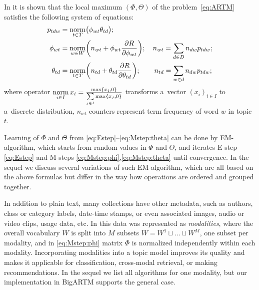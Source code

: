 \documentclass[russian,english]{llncs}
\newcommand{\norm}{\mathop{\rm norm}\limits}
\begin{document}
In \cite{voron14dan-eng} it is shown that the \mbox{local} maximum $(\Phi,\Theta)$
of the problem~\eqref{eq:ARTM} satisfies
the following system of equations:
\begin{align}
    \label{eq:Estep}
    p_{tdw} &= \norm_{t\in T} \bigl(\phi_{wt}\theta_{td}\bigr);
\\
    \label{eq:Mstep:phi}
    \phi_{wt} &= \norm_{w\in W}
        \biggl(
            n_{wt} + \phi_{wt} \frac{\partial R}{\partial \phi_{wt}}
        \biggr);
        \quad
            n_{wt} = \sum_{d\in D} n_{dw} p_{tdw};
\\
    \label{eq:Mstep:theta}
    \theta_{td} &= \norm_{t\in T}
        \biggl(
            n_{td} + \theta_{td} \frac{\partial R}{\partial \theta_{td}}
        \biggr);
        \quad\quad
            n_{td} = \sum_{w\in d} n_{dw} p_{tdw};
\end{align}
where operator
$\norm_{i \in I} x_i = \frac{\max\{x_i,0\}}{\sum\limits_{j\in I} \max\{x_j,0\}}$
transforms a~vector $(x_i)_{i \in I}$ to a~discrete distribution,
$n_{wt}$ counters represent term frequency of word $w$ in topic $t$.

Learning of $\Phi$ and $\Theta$ from \eqref{eq:Estep}--\eqref{eq:Mstep:theta} can be done by EM-algorithm,
which starts from random values in $\Phi$ and $\Theta$, and iterates
E-step \eqref{eq:Estep} and
M-steps \eqref{eq:Mstep:phi},\eqref{eq:Mstep:theta}
until convergence.
In the sequel we discuss several variations of such EM-algorithm,
which are all based on the above formulas but differ in the way how operations are ordered and grouped together.

In addition to plain text, many collections have other metadata,
such as authors, class or category labels, date-time stamps,
or even associated images, audio or video clips, usage data, etc.
In \cite{voron15nonbayesian} this data was represented as \emph{modalities},
where the overall vocabulary $W$ is split into $M$ subsets
$W = W^1 \sqcup \dots \sqcup W^M$, one subset per modality,
and in \eqref{eq:Mstep:phi} matrix $\Phi$ is normalized independently 
within each modality.
Incorporating modalities into a topic model improves its quality
and makes it applicable for classification, cross-modal retrieval, or making recommendations.
In the sequel we list all algorithms for one modality,
but our implementation in BigARTM supports the general case.
\end{document}

